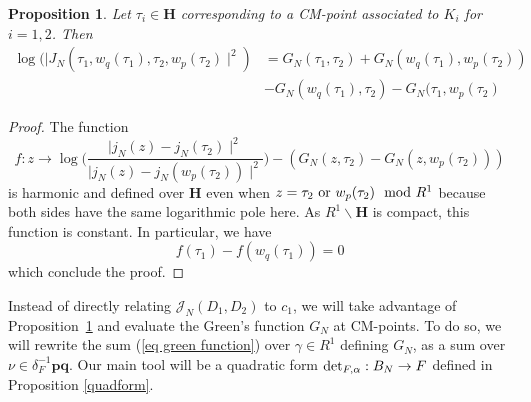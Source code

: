 \documentclass[a4paper,12pt]{article}
\newtheorem{proposition}[theorem]{Proposition}
\begin{document}
\begin{proposition}\label{Greenf}
    Let $\tau_i\in \mathbf{H}$ corresponding to a CM-point associated to $K_i$ for $i=1,2$. Then
    \begin{equation}
    \begin{split}
        \log(\mid J_N(\tau_1,w_q(\tau_1),\tau_2,w_p(\tau_2)\mid^2)&=G_N(\tau_1,\tau_2)+G_N(w_q(\tau_1),w_p(\tau_2))
        \\&-G_N(w_q(\tau_1),\tau_2)-G_N(\tau_1,w_p(\tau_2)
        \end{split}
    \end{equation}
\end{proposition}
\begin{proof}
    The function 
    \begin{equation}
        f:z\rightarrow \log\Biggl(\frac{\mid j_{N}(z)-j_{N}(\tau_2)\mid^2}{\mid j_{N}(z)-j_{N}(w_p(\tau_2))\mid^2}\Biggl)
        -(G_N(z,\tau_2)-G_N(z,w_p(\tau_2)))
    \end{equation}
is harmonic and defined over $\mathbf{H}$ even when $z=\tau_2 \textup{ or } w_p(\tau_2) \mod R^1$ because both sides have the same logarithmic pole here. As $R^1\backslash\mathbf{H}$ is compact, this function is constant. In particular, we have
\[f(\tau_1)-f(w_q(\tau_1))=0\] 
which conclude the proof.
\end{proof}
Instead of directly relating $\mathcal{J}_N(D_1,D_2)$ to $c_1$, we will take advantage of Proposition~\ref{Greenf} and evaluate the Green's function $G_N$ at CM-points. To do so, we will rewrite the sum (\ref{eq green function}) over $\gamma\in R^1$ defining $G_N$, as a sum over $\nu\in \delta_F^{-1}\mathbf{p}\mathbf{q}$. Our main tool will be a quadratic form $\textup{det}_{F,\alpha}:B_{N}\rightarrow F$ defined in Proposition \ref{quadform}.
\end{document}
